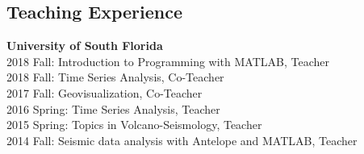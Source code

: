 \documentclass[margin,line]{res}
\begin{document}
\begin{resume}
\section{\sc Teaching Experience}
{\bf University of South Florida}\\
2018 Fall: Introduction to Programming with MATLAB, Teacher \\
2018 Fall: Time Series Analysis, Co-Teacher \\
2017 Fall: Geovisualization, Co-Teacher\\
2016 Spring: Time Series Analysis, Teacher\\
2015 Spring: Topics in Volcano-Seismology, Teacher\\
2014 Fall: Seismic data analysis with Antelope and MATLAB, Teacher



\begin{comment}

\end{comment}
\end{resume}
\end{document}
